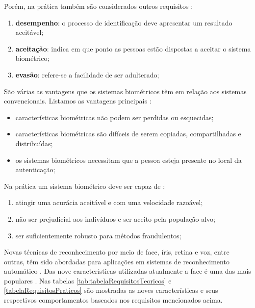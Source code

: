 	Porém, na prática também são considerados outros requisitos \cite{milene}:

	\begin{enumerate}
		\item \textbf{desempenho}: o processo de identificação deve apresentar um resultado aceitável;
		\item \textbf{aceitação}: indica em que ponto as pessoas estão dispostas a aceitar o sistema biométrico;
		\item \textbf{evasão}: refere-se a facilidade de ser adulterado;
	\end{enumerate}

	São várias as vantagens que os sistemas biométricos têm em relação aos sistemas
	convencionais. Listamos as vantagens principais \cite{drovetto}:
		
	\begin{itemize}
		\item características biométricas não podem ser perdidas ou esquecidas;
		\item características biométricas são difíceis de serem copiadas, compartilhadas e distribuídas;
		\item os sistemas biométricos necessitam que a pessoa esteja presente no local da autenticação;
	\end{itemize}

	Na prática um sistema biométrico deve ser capaz de \cite{hong}:
		
	\begin{enumerate}
		\item atingir uma acurácia aceitável e com uma velocidade razoável;
		\item não ser prejudicial aos indivíduos e ser aceito pela população alvo;
		\item ser suficientemente robusto para métodos fraudulentos;
	\end{enumerate}

	Novas técnicas de reconhecimento por meio de face, íris, retina e voz, entre
	outras, têm sido abordadas para aplicações em sistemas de reconhecimento
	automático \cite{bolle,saocarlos}. Das nove características utilizadas
	atualmente a face é uma das mais populares \cite{milene}. Nas tabelas
	\ref{tab:tabelaRequisitosTeoricos} e \ref{tabelaRequisitosPraticos} são
	mostradas as noves características e seus respectivos comportamentos baseados nos requisitos
	mencionados acima.
		
